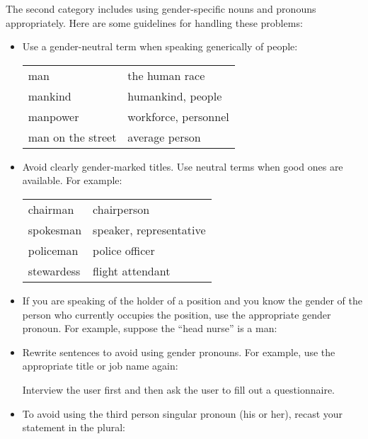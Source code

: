 The second category includes using gender-specific nouns and pronouns
appropriately. Here are some guidelines for handling these
problems:
\begin{itemize}

\item Use a gender-neutral term when speaking generically of people:

\begin{tabular}{ll}
   man                 &   the human race        \\
   mankind             &   humankind, people     \\
   manpower            &   workforce, personnel  \\
   man on the street   &   average person        \\
\end{tabular}


\item Avoid clearly gender-marked titles. Use neutral terms when
good ones are available. For example:

\begin{tabular}{ll}
  chairman     &  chairperson               \\
  spokesman    &  speaker, representative   \\
  policeman    &  police officer            \\
  stewardess   &  flight attendant          \\
\end{tabular}



\item If you are speaking of the holder of a position and you know the
  gender of the person who currently occupies the position, use the
  appropriate gender pronoun.  For example, suppose the \enquote{head nurse}
  is a man:




\item Rewrite sentences to avoid using gender pronouns. For example,
  use the appropriate title or job name again:

{Interview the user first and then ask the user to fill out a questionnaire.}



\item To avoid using the third person singular pronoun (his or her),
  recast your statement in the plural:


\end{itemize}

